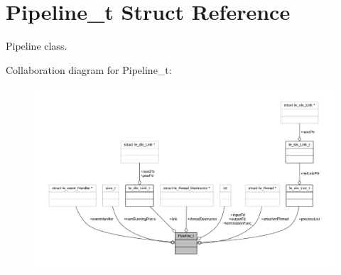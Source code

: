 \hypertarget{struct_pipeline__t}{}\section{Pipeline\+\_\+t Struct Reference}
\label{struct_pipeline__t}


Pipeline class.  




Collaboration diagram for Pipeline\+\_\+t\+:
\nopagebreak
\begin{figure}[H]
\begin{center}
\leavevmode
\includegraphics[width=350pt]{struct_pipeline__t__coll__graph}
\end{center}
\end{figure}
